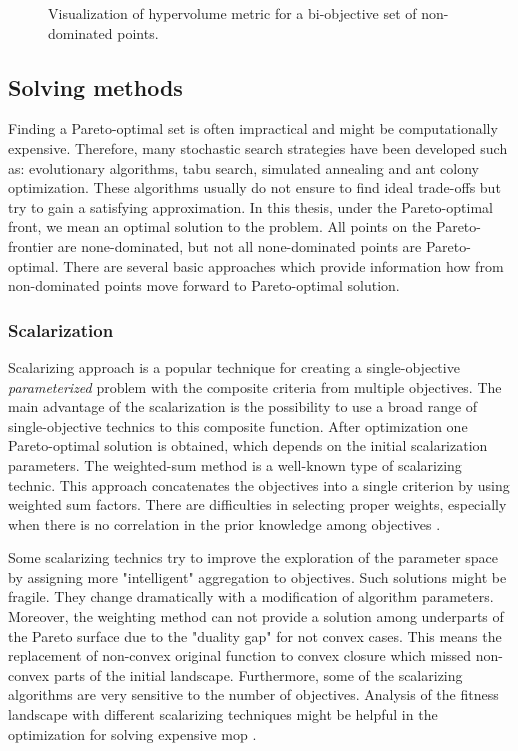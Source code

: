 \begin{figure}
                \caption[Visualization of hypervolume metric for a bi-objective set of non-dominated points]{Visualization of hypervolume metric for a bi-objective set of non-dominated points.}
                \label{fig:hypervolume}    
            \end{figure}
 
        \subsection{Solving methods}
            Finding a Pareto-optimal set is often impractical and might be computationally expensive. Therefore, many stochastic search strategies have been developed such as: evolutionary algorithms, tabu search, simulated annealing and ant colony optimization. These algorithms usually do not ensure to find ideal trade-offs but try to gain a satisfying approximation.
            In this thesis, under the Pareto-optimal front, we mean an optimal solution to the problem. All points on the Pareto-frontier are none-dominated, but not all none-dominated points are Pareto-optimal. There are several basic approaches which provide information how from non-dominated points move forward to Pareto-optimal solution.

            \subsubsection{Scalarization}
                Scalarizing approach is a popular technique for creating a single-objective \textit{parameterized} problem with the composite criteria from multiple objectives. The main advantage of the scalarization is the possibility to use a broad range of single-objective technics to this composite function. After optimization one Pareto-optimal solution is obtained, which depends on the initial scalarization parameters. The weighted-sum method is a well-known type of scalarizing technic. This approach concatenates the objectives into a single criterion by using weighted sum factors. There are difficulties in selecting proper weights, especially when there is no correlation in the prior knowledge among objectives \cite{ChughScal2019, DerbelBLV14}. 

                Some scalarizing technics try to improve the exploration of the parameter space by assigning more "intelligent" aggregation to objectives. Such solutions might be fragile. They change dramatically with a modification of algorithm parameters. Moreover, the weighting method can not provide a solution among underparts of the Pareto surface due to the "duality gap" for not convex cases. This means the replacement of non-convex original function to convex closure which missed non-convex parts of the initial landscape. Furthermore, some of the scalarizing algorithms are very sensitive to the number of objectives. Analysis of the fitness landscape with different scalarizing techniques might be helpful in the optimization for solving expensive \gls{mop} \cite{ChughScal2019}.

